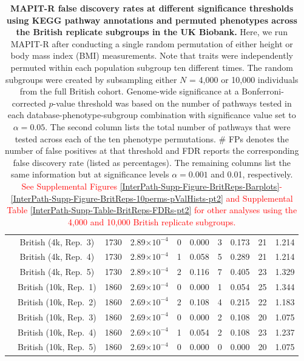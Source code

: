 \documentclass[10pt]{article}
\begin{document}
\begin{landscape}
\begin{table}[ht]
\begin{tabular}{|c|c|c|ccc|cc|cc|}
  & British (4k, Rep.~3) & 1730 & 2.89$\times 10^{-4}$ & 0 & 0.000 & 3 & 0.173 & 21 & 1.214 \\
  & British (4k, Rep.~4) & 1730 & 2.89$\times 10^{-4}$ & 1 & 0.058 & 5 & 0.289 & 21 & 1.214 \\
  & British (4k, Rep.~5) & 1730 & 2.89$\times 10^{-4}$ & 2 & 0.116 & 7 & 0.405 & 23 & 1.329 \\
  & British (10k, Rep.~1) & 1860 & 2.69$\times 10^{-4}$ & 0 & 0.000 & 1 & 0.054 & 25 & 1.344 \\
  & British (10k, Rep.~2) & 1860 & 2.69$\times 10^{-4}$ & 2 & 0.108 & 4 & 0.215 & 22 & 1.183 \\
  & British (10k, Rep.~3) & 1860 & 2.69$\times 10^{-4}$ & 0 & 0.000 & 2 & 0.108 & 20 & 1.075 \\
  & British (10k, Rep.~4) & 1860 & 2.69$\times 10^{-4}$ & 1 & 0.054 & 2 & 0.108 & 23 & 1.237 \\
  & British (10k, Rep.~5) & 1860 & 2.69$\times 10^{-4}$ & 0 & 0.000 & 0 & 0.000 & 20 & 1.075 \\ 
   \hline
\end{tabular}
\caption{\textbf{MAPIT-R false discovery rates at different significance thresholds using KEGG pathway annotations and permuted phenotypes across the British replicate subgroups in the UK Biobank.} Here, we run MAPIT-R after conducting a single random permutation of either height or body mass index (BMI) measurements. Note that traits were independently permuted within each population subgroup ten different times. The random subgroups were created by subsampling either $N$ = 4,000 or 10,000 individuals from the full British cohort. Genome-wide significance at a Bonferroni-corrected $p$-value threshold was based on the number of pathways tested in each database-phenotype-subgroup combination with significance value set to $\alpha = 0.05$. The second column lists the total number of pathways that were tested across each of the ten phenotype permutations. \# FPs denotes the number of false positives at that threshold and FDR reports the corresponding false discovery rate (listed as percentages). The remaining columns list the same information but at significance levels $\alpha = 0.001$ and 0.01, respectively. \textcolor{red}{See Supplemental Figures \ref{InterPath-Supp-Figure-BritReps-Barplots}-\ref{InterPath-Supp-Figure-BritReps-10perms-pValHists-pt2} and Supplemental Table \ref{InterPath-Supp-Table-BritReps-FDRs-pt2} for other analyses using the 4,000 and 10,000 British replicate subgroups.}}
\label{InterPath-Supp-Table-BritReps-FDRs-pt1}
\end{table}
\end{landscape}
\end{document}
